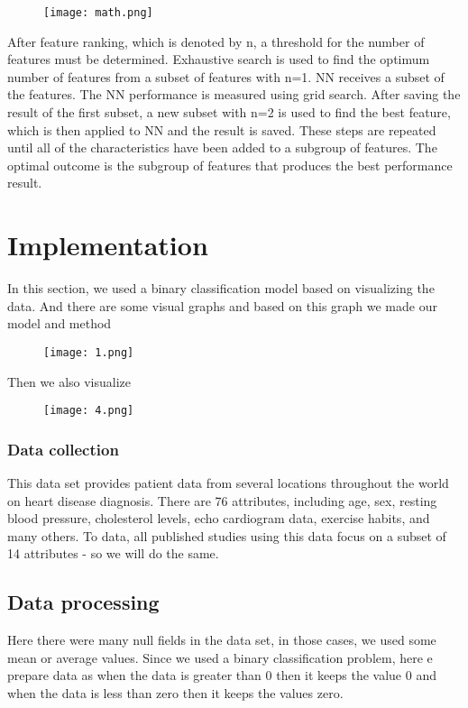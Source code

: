 \documentclass[12pt]{article}
\begin{document}
\begin{figure}[h]
    \centering
    \texttt{[image: math.png]}
\end{figure}

After feature ranking, which is denoted by n, a threshold for the number of features must be determined. Exhaustive search is used to find the optimum number of features from a subset of features with n=1. NN receives a subset of the features. The NN performance is measured using grid search. After saving the result of the first subset, a new subset with n=2 is used to find the best feature, which is then applied to NN and the result is saved. These steps are repeated until all of the characteristics have been added to a subgroup of features. The optimal outcome is the subgroup of features that produces the best performance result. 

\section{Implementation}
In this section, we used a binary classification model based on visualizing the data. And there are some visual graphs and based on this graph we made our model and method

\begin{figure}[h]
    \centering
    \texttt{[image: 1.png]}
\end{figure}


Then we also visualize


\begin{figure}[h]
    \centering
    \texttt{[image: 4.png]}
\end{figure}


\subsubsection{Data collection}
This data set provides patient data from several locations throughout the world on heart disease diagnosis. There are 76 attributes, including age, sex, resting blood pressure, cholesterol levels, echo cardiogram data, exercise habits, and many others. To data, all published studies using this data focus on a subset of 14 attributes - so we will do the same.




\subsection{Data processing}
Here there were many null fields in the data set, in those cases, we used some mean or average values. Since we used a binary classification problem, here e prepare data as when the data is greater than 0 then it keeps the value 0 and when the data is less than zero then it keeps the values zero. 
\end{document}
